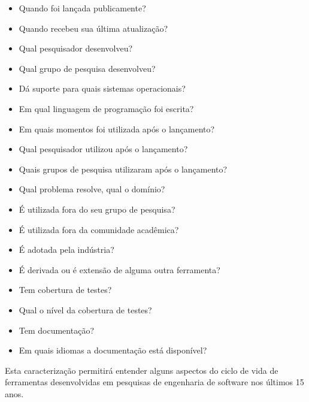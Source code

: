 \documentclass[12pt]{article}
\begin{document}
\begin{itemize}
\item Quando foi lançada publicamente?
\item Quando recebeu sua última atualização?
\item Qual pesquisador desenvolveu?
\item Qual grupo de pesquisa desenvolveu?
\item Dá suporte para quais sistemas operacionais?
\item Em qual linguagem de programação foi escrita?
\item Em quais momentos foi utilizada após o lançamento?
\item Qual pesquisador utilizou após o lançamento?
\item Quais grupos de pesquisa utilizaram após o lançamento?
\item Qual problema resolve, qual o domínio?
\item É utilizada fora do seu grupo de pesquisa?
\item É utilizada fora da comunidade acadêmica?
\item É adotada pela indústria?
\item É derivada ou é extensão de alguma outra ferramenta?
\item Tem cobertura de testes?
\item Qual o nível da cobertura de testes?
\item Tem documentação?
\item Em quais idiomas a documentação está disponível?
\end{itemize}

Esta caracterização permitirá entender alguns aspectos do ciclo de vida de
ferramentas desenvolvidas em pesquisas de engenharia de software nos últimos
15 anos.

\end{document}

